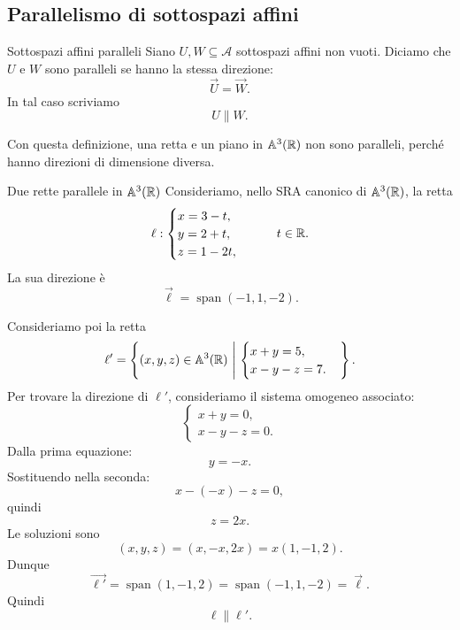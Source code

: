 \documentclass[a4paper]{article}
\begin{document}
\subsection{Parallelismo di sottospazi affini}

\begin{snippetdefinition}{Sottospazi affini paralleli}
    Siano \(U,W\subseteq\mathcal{A}\) sottospazi affini non vuoti. Diciamo che \(U\) e \(W\) sono paralleli se hanno la stessa direzione:
    \[
        \overrightarrow{U}=\overrightarrow{W}.
    \]
    In tal caso scriviamo
    \[
        U\parallel W.
    \]
\end{snippetdefinition}

Con questa definizione, una retta e un piano in \(\mathbb{A}^3(\mathbb{R})\) non sono paralleli, perché hanno direzioni di dimensione diversa.

\begin{snippetexample}{Due rette parallele in \(\mathbb{A}^3(\mathbb{R})\)}
    Consideriamo, nello SRA canonico di \(\mathbb{A}^3(\mathbb{R})\), la retta
    \[
        \ell:
        \begin{cases}
            x=3-t,\\
            y=2+t,\\
            z=1-2t,
        \end{cases}
        \qquad
        t\in\mathbb{R}.
    \]
    La sua direzione è
    \[
        \overrightarrow{\ell}
        =
        \operatorname{span}(-1,1,-2).
    \]

    Consideriamo poi la retta
    \[
        \ell'
        =
        \left\{
            (x,y,z)\in\mathbb{A}^3(\mathbb{R})
            \ \middle|\
            \begin{cases}
                x+y=5,\\
                x-y-z=7.
            \end{cases}
        \right\}.
    \]
    Per trovare la direzione di \(\ell'\), consideriamo il sistema omogeneo associato:
    \[
        \begin{cases}
            x+y=0,\\
            x-y-z=0.
        \end{cases}
    \]
    Dalla prima equazione:
    \[
        y=-x.
    \]
    Sostituendo nella seconda:
    \[
        x-(-x)-z=0,
    \]
    quindi
    \[
        z=2x.
    \]
    Le soluzioni sono
    \[
        (x,y,z)=(x,-x,2x)=x(1,-1,2).
    \]
    Dunque
    \[
        \overrightarrow{\ell'}
        =
        \operatorname{span}(1,-1,2)
        =
        \operatorname{span}(-1,1,-2)
        =
        \overrightarrow{\ell}.
    \]
    Quindi
    \[
        \ell\parallel \ell'.
    \]
\end{snippetexample}
\end{document}

